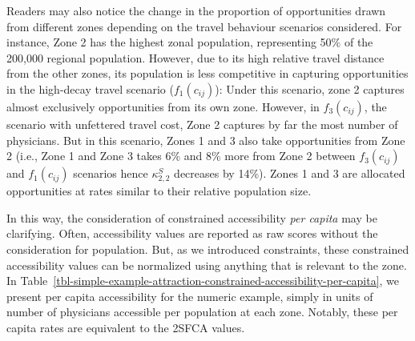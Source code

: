 \documentclass[
]{article}
\begin{document}
Readers may also notice the change in the proportion of opportunities
drawn from different zones depending on the travel behaviour scenarios
considered. For instance, Zone 2 has the highest zonal population,
representing 50\% of the 200,000 regional population. However, due to
its high relative travel distance from the other zones, its population
is less competitive in capturing opportunities in the high-decay travel
scenario (\(f_1(c_{ij})\)): Under this scenario, zone 2 captures almost
exclusively opportunities from its own zone. However, in
\(f_3(c_{ij})\), the scenario with unfettered travel cost, Zone 2
captures by far the most number of physicians. But in this scenario,
Zones 1 and 3 also take opportunities from Zone 2 (i.e., Zone 1 and Zone
3 takes 6\% and 8\% more from Zone 2 between \(f_3(c_{ij})\) and
\(f_1(c_{ij})\) scenarios hence \(\kappa_{2,2}^S\) decreases by 14\%).
Zones 1 and 3 are allocated opportunities at rates similar to their
relative population size.

In this way, the consideration of constrained accessibility \emph{per
capita} may be clarifying. Often, accessibility values are reported as
raw scores without the consideration for population. But, as we
introduced constraints, these constrained accessibility values can be
normalized using anything that is relevant to the zone. In
Table~\ref{tbl-simple-example-attraction-constrained-accessibility-per-capita},
we present per capita accessibility for the numeric example, simply in
units of number of physicians accessible per population at each zone.
Notably, these per capita rates are equivalent to the 2SFCA values.
\end{document}
